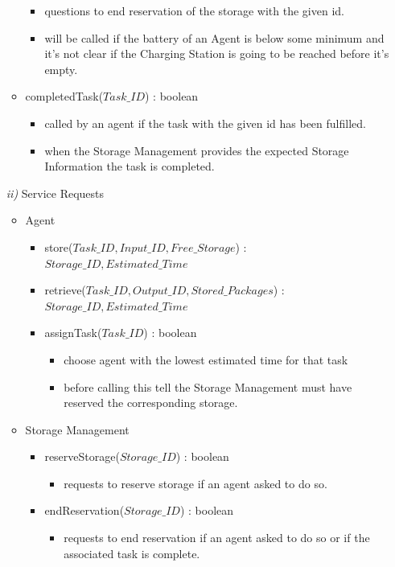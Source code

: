 \documentclass{article}
\begin{document}
\begin{enumerate}
\begin{itemize}
		\begin{itemize}
			\item questions to end reservation of the storage with the given id.
			\item will be called if the battery of an Agent is below some minimum and it's not clear if the Charging Station is going to be reached before it's empty.
		\end{itemize}
		\item completedTask($Task\_ID$) : boolean
		\begin{itemize}
			\item called by an agent if the task with the given id has been fulfilled.
			\item when the Storage Management provides the expected Storage Information the task is completed.
		\end{itemize}
	\end{itemize}
	\item[\textit{ii)}] Service Requests
	\begin{itemize}
		\item Agent
		\begin{itemize}
			\item store($Task\_ID, Input\_ID, Free\_Storage$) : $Storage\_ID, Estimated\_Time$
			\item retrieve($Task\_ID, Output\_ID, Stored\_Packages$) : $Storage\_ID, Estimated\_Time$
			\item assignTask($Task\_ID$) : boolean
			\begin{itemize}
				\item choose agent with the lowest estimated time for that task
				\item before calling this tell the Storage Management must have reserved the corresponding storage.
			\end{itemize}
		\end{itemize}
		\item Storage Management
		\begin{itemize}
			\item reserveStorage($Storage\_ID$) : boolean
			\begin{itemize}
				\item requests to reserve storage if an agent asked to do so.
			\end{itemize}
			\item endReservation($Storage\_ID$) : boolean
			\begin{itemize}
				\item requests to end reservation if an agent asked to do so or if the associated task is complete.

\end{itemize}
\end{itemize}
\end{itemize}
\end{enumerate}
\end{document}
